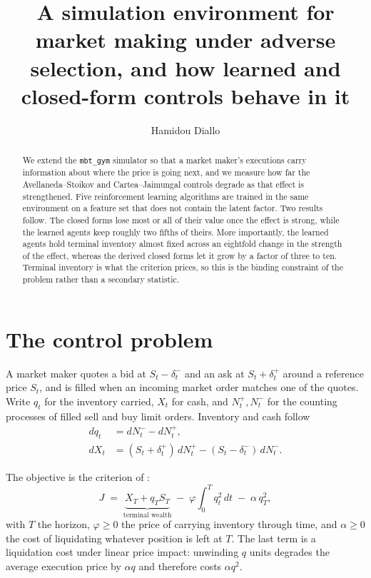 \documentclass[10pt,twocolumn]{article}
\title{\vspace{-1.5em}\Large A simulation environment for market making under
adverse selection, and how learned and closed-form controls behave in it}
\author{Hamidou Diallo}
\date{}
\begin{document}
\maketitle

\begin{abstract}
\small
We extend the \texttt{mbt\_gym} simulator so that a market maker's executions carry information about where the
price is going next, and we measure how far the Avellaneda--Stoikov and Cartea--Jaimungal controls degrade as
that effect is strengthened. Five reinforcement learning algorithms are trained in the same environment on a
feature set that does not contain the latent factor. Two results follow. The closed forms lose most or all of
their value once the effect is strong, while the learned agents keep roughly two fifths of theirs. More
importantly, the learned agents hold terminal inventory almost fixed across an eightfold change in the strength
of the effect, whereas the derived closed forms let it grow by a factor of three to ten. Terminal inventory is
what the criterion prices, so this is the binding constraint of the problem rather than a secondary statistic.
\end{abstract}

\section{The control problem}

A market maker quotes a bid at $S_t - \delta^-_t$ and an ask at $S_t + \delta^+_t$ around a reference price
$S_t$, and is filled when an incoming market order matches one of the quotes. Write $q_t$ for the inventory
carried, $X_t$ for cash, and $N^{+}_t, N^{-}_t$ for the counting processes of filled sell and buy limit orders.
Inventory and cash follow
\begin{align}
dq_t &= dN^-_t - dN^+_t, \\
dX_t &= (S_t + \delta^+_t)\,dN^+_t - (S_t - \delta^-_t)\,dN^-_t .
\end{align}

The objective is the criterion of \citet{cartea2015book}:
\begin{equation}
J \;=\; \underbrace{X_T + q_T S_T}_{\text{terminal wealth}}
\;-\; \varphi \int_0^T q_t^2\,dt \;-\; \alpha\, q_T^2 ,
\label{eq:criterion}
\end{equation}
with $T$ the horizon, $\varphi \ge 0$ the price of carrying inventory through time, and $\alpha \ge 0$ the cost
of liquidating whatever position is left at $T$. The last term is a liquidation cost under linear price impact:
unwinding $q$ units degrades the average execution price by $\alpha q$ and therefore costs $\alpha q^2$.
\end{document}
